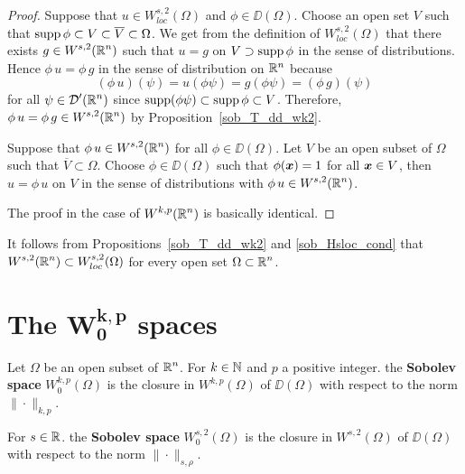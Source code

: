 \begin{proof}
Suppose that $\displaystyle u \in W^{s,2}_{loc}(\Omega)$ and
$\phi \in \DD(\Omega)$.  Choose an open set $V$ such that
$\displaystyle \operatorname{supp} \phi \subset V \subset \overline{V}\subset \Omega$.
We get from the definition of $\displaystyle W^{s,2}_{loc}(\Omega)$
that there exists $\displaystyle g\in W^{s,2}(\mathbb{R}^n)$ such that $u=g$ on
$V \supset \operatorname{supp} \phi$ in the sense of distributions.  Hence
$\phi\, u = \phi \, g$ in the sense of distribution on $\mathbb{R}^n$ because
\[
  (\phi \, u)(\psi) = u(\phi\psi) = g(\phi\psi) = (\phi\,g)(\psi)
\]
for all $\displaystyle \psi \in \mathcal{D}'(\mathbb{R}^n)$ since
$\operatorname{supp}(\phi\psi) \subset \operatorname{supp}
\phi \subset V$.  Therefore,
$\displaystyle \phi\, u = \phi \, g \in W^{s,2}(\mathbb{R}^n)$ by
Proposition~\ref{sob_T_dd_wk2}.

Suppose that $\displaystyle \phi\,u \in W^{s,2}(\mathbb{R}^n)$ for all
$\displaystyle \phi\in \DD(\Omega)$.  Let $V$ be an open
subset of $\Omega$ such that $\overline{V}\subset \Omega$.  Choose
$\displaystyle \phi \in \DD(\Omega)$ such that $\phi({\bm{x}})=1$ for all
${\bm{x}} \in V$, then $u = \phi \, u$ on $V$ in the sense of
distributions with $\displaystyle \phi \, u \in W^{s,2}(\mathbb{R}^n)$.

 The proof in the case of $\displaystyle W^{k,p}(\mathbb{R}^n)$ is
basically identical.
\end{proof}

It follows from Propositions~\ref{sob_T_dd_wk2} and
\ref{sob_Hsloc_cond} that
$\displaystyle W^{s,2}(\mathbb{R}^n) \subset W^{s,2}_{loc}(\Omega)$
for every open set $\displaystyle \Omega \subset \mathbb{R}^n$.

\section{The $\displaystyle \mathbf{W^{k,p}_0}$ spaces}

\begin{defn}
Let $\Omega$ be an open subset of $\displaystyle \mathbb{R}^n$.
For $k\in \mathbb{N}$ and $p$ a positive integer. the
{\bfseries Sobolev space}
$\displaystyle W^{k,p}_0(\Omega)$ is the closure in 
$\displaystyle W^{k,p}(\Omega)$ of $\DD(\Omega)$ with respect to the norm
$\|\cdot\|_{k,p}$.

For $s \in \mathbb{R}$. the
{\bfseries Sobolev space}
$\displaystyle W^{s,2}_0(\Omega)$ is the closure in 
$\displaystyle W^{s,2}(\Omega)$ of $\DD(\Omega)$ with respect to the norm
$\|\cdot\|_{s,\rho}$.
\end{defn}

